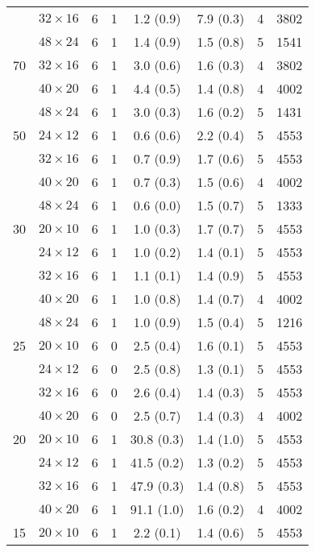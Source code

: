 \begin{longtable}{cccccccc}
    & $32 \times  16$ &  6 & 1 & 1.2 \; (0.9) & 7.9 \; (0.3) & 4 & 3802 \\
    & $48 \times  24$ &  6 & 1 & 1.4 \; (0.9) & 1.5 \; (0.8) & 5 & 1541 \\
\midrule
 70 & $32 \times  16$ &  6 & 1 & 3.0 \; (0.6) & 1.6 \; (0.3) & 4 & 3802 \\
    & $40 \times  20$ &  6 & 1 & 4.4 \; (0.5) & 1.4 \; (0.8) & 4 & 4002 \\
    & $48 \times  24$ &  6 & 1 & 3.0 \; (0.3) & 1.6 \; (0.2) & 5 & 1431 \\
\midrule
 50 & $24 \times  12$ &  6 & 1 & 0.6 \; (0.6) & 2.2 \; (0.4) & 5 & 4553 \\
    & $32 \times  16$ &  6 & 1 & 0.7 \; (0.9) & 1.7 \; (0.6) & 5 & 4553 \\
    & $40 \times  20$ &  6 & 1 & 0.7 \; (0.3) & 1.5 \; (0.6) & 4 & 4002 \\
    & $48 \times  24$ &  6 & 1 & 0.6 \; (0.0) & 1.5 \; (0.7) & 5 & 1333 \\
\midrule
 30 & $20 \times  10$ &  6 & 1 & 1.0 \; (0.3) & 1.7 \; (0.7) & 5 & 4553 \\
    & $24 \times  12$ &  6 & 1 & 1.0 \; (0.2) & 1.4 \; (0.1) & 5 & 4553 \\
    & $32 \times  16$ &  6 & 1 & 1.1 \; (0.1) & 1.4 \; (0.9) & 5 & 4553 \\
    & $40 \times  20$ &  6 & 1 & 1.0 \; (0.8) & 1.4 \; (0.7) & 4 & 4002 \\
    & $48 \times  24$ &  6 & 1 & 1.0 \; (0.9) & 1.5 \; (0.4) & 5 & 1216 \\
\midrule
 25 & $20 \times  10$ &  6 & 0 & 2.5 \; (0.4) & 1.6 \; (0.1) & 5 & 4553 \\
    & $24 \times  12$ &  6 & 0 & 2.5 \; (0.8) & 1.3 \; (0.1) & 5 & 4553 \\
    & $32 \times  16$ &  6 & 0 & 2.6 \; (0.4) & 1.4 \; (0.3) & 5 & 4553 \\
    & $40 \times  20$ &  6 & 0 & 2.5 \; (0.7) & 1.4 \; (0.3) & 4 & 4002 \\
\midrule
 20 & $20 \times  10$ &  6 & 1 & 30.8 \; (0.3) & 1.4 \; (1.0) & 5 & 4553 \\
    & $24 \times  12$ &  6 & 1 & 41.5 \; (0.2) & 1.3 \; (0.2) & 5 & 4553 \\
    & $32 \times  16$ &  6 & 1 & 47.9 \; (0.3) & 1.4 \; (0.8) & 5 & 4553 \\
    & $40 \times  20$ &  6 & 1 & 91.1 \; (1.0) & 1.6 \; (0.2) & 4 & 4002 \\
\midrule
 15 & $20 \times  10$ &  6 & 1 & 2.2 \; (0.1) & 1.4 \; (0.6) & 5 & 4553 \\

\end{longtable}
